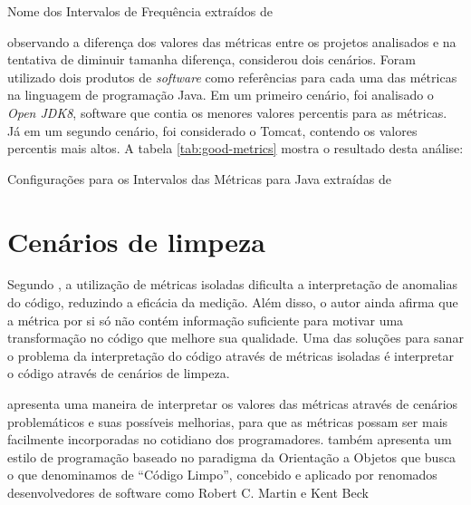 \begin{table}[!ht]
	\begin{center}
	
	\caption{Nome dos Intervalos de Frequência extraídos de }
	\label{tab:nomes}
	\end{center}
	\end{table}
	\FloatBarrier
	
 observando a diferença dos valores das métricas entre os projetos analisados e na tentativa de diminuir tamanha diferença, considerou dois cenários. Foram utilizado dois produtos de \textit{software} como referências para cada uma das
métricas na linguagem de programação Java. Em um primeiro cenário, foi analisado o \textit{Open JDK8}, software que contia os menores valores percentis para as métricas. Já em um segundo cenário, foi considerado o Tomcat, contendo os valores percentis mais altos. A tabela \ref{tab:good-metrics} mostra o resultado desta análise:

\begin{table}[!ht]
	\begin{center}
		
	\caption{Configurações para os Intervalos das Métricas para Java extraídas de }
	\label{tab:good-metrics}
	\end{center}
	\end{table}
	\FloatBarrier
   


\section{Cenários de limpeza} 

Segundo , a utilização de métricas isoladas dificulta a interpretação de anomalias do código, reduzindo a eficácia da medição. Além disso, o autor ainda afirma que a métrica por si só não contém informação suficiente para motivar uma transformação no código que melhore sua qualidade. Uma das soluções para sanar o problema da interpretação do código através de métricas isoladas é  interpretar o código através de cenários de limpeza.

 apresenta uma maneira de interpretar os valores das métricas através de cenários problemáticos e suas possíveis melhorias, para que as métricas possam ser mais facilmente incorporadas no cotidiano dos programadores.  também apresenta um estilo de programação baseado no paradigma da Orientação a Objetos que busca o que denominamos de “Código Limpo”, concebido e aplicado por renomados desenvolvedores de software como Robert C. Martin \cite{Martin2008} e Kent Beck \cite{Beck2007}	
	
